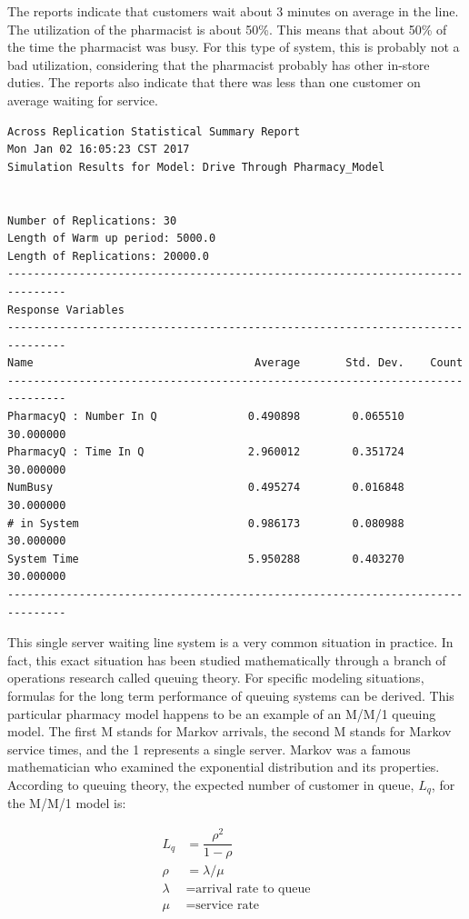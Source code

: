 \documentclass[
]{book}
\theoremstyle{definition}
\theoremstyle{definition}
\theoremstyle{definition}
\theoremstyle{definition}
\theoremstyle{remark}
\begin{document}
The reports indicate that customers wait about 3 minutes on average in
the line. The utilization of the pharmacist is about 50\%. This means
that about 50\% of the time the pharmacist was busy. For this type of
system, this is probably not a bad utilization, considering that the
pharmacist probably has other in-store duties. The reports also indicate
that there was less than one customer on average waiting for service.

\begin{verbatim}
Across Replication Statistical Summary Report
Mon Jan 02 16:05:23 CST 2017
Simulation Results for Model: Drive Through Pharmacy_Model


Number of Replications: 30
Length of Warm up period: 5000.0
Length of Replications: 20000.0
-------------------------------------------------------------------------------
Response Variables
-------------------------------------------------------------------------------
Name                                  Average       Std. Dev.    Count 
-------------------------------------------------------------------------------
PharmacyQ : Number In Q              0.490898        0.065510       30.000000 
PharmacyQ : Time In Q                2.960012        0.351724       30.000000 
NumBusy                              0.495274        0.016848       30.000000 
# in System                          0.986173        0.080988       30.000000 
System Time                          5.950288        0.403270       30.000000 
-------------------------------------------------------------------------------
\end{verbatim}

This single server waiting line system is a very common situation in
practice. In fact, this exact situation has been studied mathematically
through a branch of operations research called queuing theory. For
specific modeling situations, formulas for the long term performance of
queuing systems can be derived. This particular pharmacy model happens
to be an example of an M/M/1 queuing model. The first M stands for
Markov arrivals, the second M stands for Markov service times, and the 1
represents a single server. Markov was a famous mathematician who
examined the exponential distribution and its properties. According to
queuing theory, the expected number of customer in queue, \(L_q\), for the
M/M/1 model is:

\[
\begin{aligned}
\label{ch4:eq:mm1}
L_q & = \dfrac{\rho^2}{1 - \rho} \\
\rho & = \lambda/\mu \\
\lambda & = \text{arrival rate to queue} \\
\mu & = \text{service rate}
\end{aligned}
\]
\end{document}
